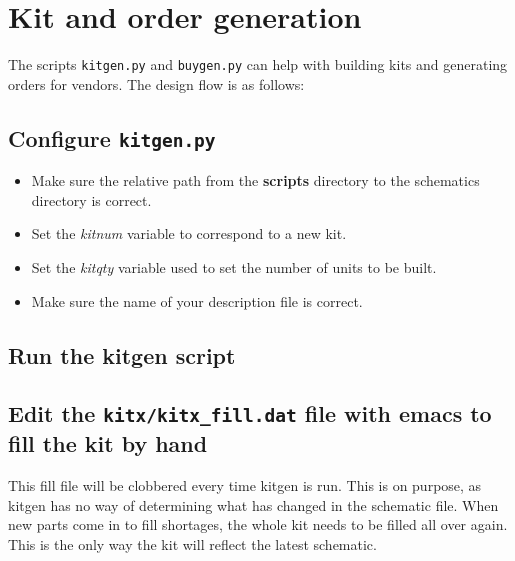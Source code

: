 \section{Kit and order generation}
The scripts \texttt{kitgen.py} and \texttt{buygen.py} can help with building kits and generating orders for vendors.  The design flow is as follows:

\subsection{Configure \texttt{kitgen.py}}
    \begin{itemize}
        \item Make sure the relative path from the \textbf{scripts} directory to the schematics directory is correct.
        \item Set the \textit{kitnum} variable to correspond to a new kit.
        \item Set the \textit{kitqty} variable used to set the number of units to be built.
        \item Make sure the name of your description file is correct.
    \end{itemize}

\subsection{Run the kitgen script}


\subsection[Fill the kit by hand]{Edit the \texttt{kitx/kitx\_fill.dat} file with emacs to fill the kit by hand}
This fill file will be clobbered every time kitgen is run.  This is on purpose, as kitgen has no way of determining what has changed in the schematic file.  When new parts come in to fill shortages, the whole kit needs to be filled all over again.  This is the only way the kit will reflect the latest schematic.

